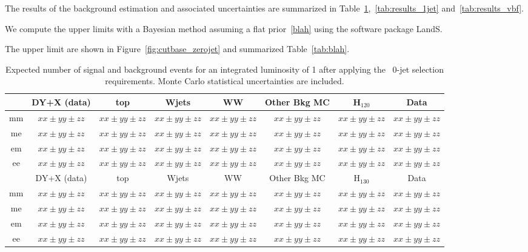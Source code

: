 The results of the background estimation and associated uncertainties
are summarized in
Table~\ref{tab:results_zerojet},~\ref{tab:results_1jet}
and~\ref{tab:results_vbf}.

We compute the upper limits with a Bayesian method assuming a flat
prior~\ref{blah} using the software package LandS.

The upper limit are shown in Figure~\ref{fig:cutbase_zerojet} and
summarized Table~\ref{tab:blah}.

\begin{table}[!ht]
  \begin{center}
 {\footnotesize
  \begin{tabular} {|c|c|c|c|c|c|c|c|}
  \hline
  & DY+X (data) & top & Wjets & WW & Other Bkg MC & H$_{120}$ & Data \\
  \hline
  mm & $xx \pm yy \pm zz$ & $xx \pm yy \pm zz$ & $xx \pm yy \pm zz$ & $xx \pm yy \pm zz$ & $xx \pm yy \pm zz$ & $xx \pm yy \pm zz$ & $xx \pm yy \pm zz$ \\
  me & $xx \pm yy \pm zz$ & $xx \pm yy \pm zz$ & $xx \pm yy \pm zz$ & $xx \pm yy \pm zz$ & $xx \pm yy \pm zz$ & $xx \pm yy \pm zz$ & $xx \pm yy \pm zz$ \\
  em & $xx \pm yy \pm zz$ & $xx \pm yy \pm zz$ & $xx \pm yy \pm zz$ & $xx \pm yy \pm zz$ & $xx \pm yy \pm zz$ & $xx \pm yy \pm zz$ & $xx \pm yy \pm zz$ \\
  ee & $xx \pm yy \pm zz$ & $xx \pm yy \pm zz$ & $xx \pm yy \pm zz$ & $xx \pm yy \pm zz$ & $xx \pm yy \pm zz$ & $xx \pm yy \pm zz$ & $xx \pm yy \pm zz$ \\
  \hline
  \hline
  & DY+X (data) & top & Wjets & WW & Other Bkg MC & H$_{130}$ & Data \\
  \hline
  mm & $xx \pm yy \pm zz$ & $xx \pm yy \pm zz$ & $xx \pm yy \pm zz$ & $xx \pm yy \pm zz$ & $xx \pm yy \pm zz$ & $xx \pm yy \pm zz$ & $xx \pm yy \pm zz$ \\
  me & $xx \pm yy \pm zz$ & $xx \pm yy \pm zz$ & $xx \pm yy \pm zz$ & $xx \pm yy \pm zz$ & $xx \pm yy \pm zz$ & $xx \pm yy \pm zz$ & $xx \pm yy \pm zz$ \\
  em & $xx \pm yy \pm zz$ & $xx \pm yy \pm zz$ & $xx \pm yy \pm zz$ & $xx \pm yy \pm zz$ & $xx \pm yy \pm zz$ & $xx \pm yy \pm zz$ & $xx \pm yy \pm zz$ \\
  ee & $xx \pm yy \pm zz$ & $xx \pm yy \pm zz$ & $xx \pm yy \pm zz$ & $xx \pm yy \pm zz$ & $xx \pm yy \pm zz$ & $xx \pm yy \pm zz$ & $xx \pm yy \pm zz$ \\
  \hline
  \end{tabular}
  }
  \caption{Expected number of signal and background events for an 
  integrated luminosity of 1\ifb{} after 
  applying the \ww\ 0-jet selection requirements. Monte Carlo statistical uncertainties are 
  included.}
   \label{tab:results_zerojet}
  \end{center}
\end{table}

